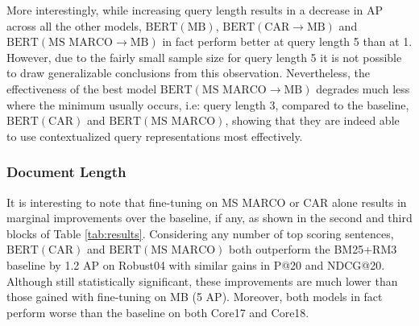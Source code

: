More interestingly, while increasing query length results in a decrease in AP across all the other models, $ \textrm{BERT}(\textrm{MB}) $, $ \textrm{BERT}(\textrm{CAR}\rightarrow\textrm{MB}) $ and $ \textrm{BERT}(\textrm{MS MARCO}\rightarrow\textrm{MB}) $ in fact perform better at query length 5 than at 1.
However, due to the fairly small sample size for query length 5 it is not possible to draw generalizable conclusions from this observation.
Nevertheless, the effectiveness of the best model  $ \textrm{BERT}(\textrm{MS MARCO}\rightarrow\textrm{MB}) $ degrades much less where the minimum usually occurs, i.e: query length 3, compared to the baseline, $ \textrm{BERT}(\textrm{CAR}) $ and $ \textrm{BERT}(\textrm{MS MARCO}) $, showing that they are indeed able to use contextualized query representations most effectively.

\subsubsection{Document Length}

\begin{table*}[t!]
\centering{}
\caption{Ranking effectiveness on shortened MS MARCO and CAR evaluated on Robust04.}
\label{tab:results-chopped}
\end{table*}

It is interesting to note that fine-tuning on MS MARCO or CAR alone results in marginal improvements over the baseline, if any, as shown in the second and third blocks of Table \ref{tab:results}.
Considering any number of top scoring sentences, $ \textrm{BERT}(\textrm{CAR}) $ and $ \textrm{BERT}(\textrm{MS MARCO}) $ both outperform the BM25+RM3 baseline by 1.2 AP on Robust04 with similar gains in P@20 and NDCG@20.
Although still statistically significant, these improvements are much lower than those gained with fine-tuning on MB (5 AP).
Moreover, both models in fact perform worse than the baseline on both Core17 and Core18.

